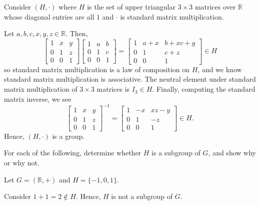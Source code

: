 \begin{exer}
Consider $ (H,\cdot) $ where $ H $ is the set of upper triangular $ 3\times 3 $ matrices over $ \mathbb{R} $ whose diagonal entries are all $ 1 $ and $ \cdot $ is standard matrix multiplication.
\end{exer}
\begin{sltn}
Let $ a,b,c,x,y,z\in\mathbb{R} $. Then,
\begin{equation*}
    \begin{bmatrix}
        1 & x & y \\
        0 & 1 & z \\
        0 & 0 & 1
    \end{bmatrix}
    \begin{bmatrix}
        1 & a & b \\
        0 & 1 & c \\
        0 & 0 & 1
    \end{bmatrix}
    =
    \begin{bmatrix}
        1 & a+x & b+xc+y \\
        0 & 1 & c+z \\
        0 & 0 & 1
    \end{bmatrix}
    \in H
\end{equation*}
so standard matrix multiplication is a law of composition on $ H $, and we know standard matrix multiplication is associative. The neutral element under standard matrix multiplication of $ 3\times 3 $ matrices is $ I_3\in H $. Finally, computing the standard matrix inverse, we see
\begin{equation*}
    \begin{bmatrix}
        1 & x & y \\
        0 & 1 & z \\
        0 & 0 & 1
    \end{bmatrix}^{-1}
    =
    \begin{bmatrix}
        1 & -x & xz-y \\
        0 & 1 & -z \\
        0 & 0 & 1
    \end{bmatrix}
    \in H.
\end{equation*}
Hence, $ (H,\cdot) $ is a group.
\end{sltn}

For each of the following, determine whether $ H $ is a subgroup of $ G $, and show why or why not.

\begin{exer}
Let $ G=(\mathbb{R},+) $ and $ H=\{-1,0,1\} $.
\end{exer}
\begin{sltn}
Consider $ 1+1=2\notin H $. Hence, $ H $ is not a subgroup of $ G $.
\end{sltn}


